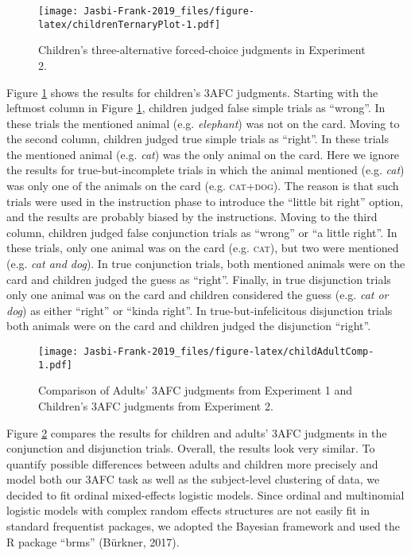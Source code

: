\documentclass[,man,floatsintext]{apa6}
\begin{document}
\begin{figure}
\centering
\texttt{[image: Jasbi-Frank-2019\_files/figure-latex/childrenTernaryPlot-1.pdf]}
\caption{\label{fig:childrenTernaryPlot}Children's three-alternative forced-choice judgments in Experiment 2.}
\end{figure}

Figure \ref{fig:childrenTernaryPlot} shows the results for children's 3AFC judgments. Starting with the leftmost column in Figure \ref{fig:childrenTernaryPlot}, children judged false simple trials as \enquote{wrong}. In these trials the mentioned animal (e.g. \emph{elephant}) was not on the card. Moving to the second column, children judged true simple trials as \enquote{right}. In these trials the mentioned animal (e.g. \emph{cat}) was the only animal on the card. Here we ignore the results for true-but-incomplete trials in which the animal mentioned (e.g. \emph{cat}) was only one of the animals on the card (e.g. \textsc{cat+dog}). The reason is that such trials were used in the instruction phase to introduce the \enquote{little bit right} option, and the results are probably biased by the instructions. Moving to the third column, children judged false conjunction trials as \enquote{wrong} or \enquote{a little right}. In these trials, only one animal was on the card (e.g. \textsc{cat}), but two were mentioned (e.g. \emph{cat and dog}). In true conjunction trials, both mentioned animals were on the card and children judged the guess as \enquote{right}. Finally, in true disjunction trials only one animal was on the card and children considered the guess (e.g. \emph{cat or dog}) as either \enquote{right} or \enquote{kinda right}. In true-but-infelicitous disjunction trials both animals were on the card and children judged the disjunction \enquote{right}.

\begin{figure}
\centering
\texttt{[image: Jasbi-Frank-2019\_files/figure-latex/childAdultComp-1.pdf]}
\caption{\label{fig:childAdultComp}Comparison of Adults' 3AFC judgments from Experiment 1 and Children's 3AFC judgments from Experiment 2.}
\end{figure}

Figure \ref{fig:childAdultComp} compares the results for children and adults' 3AFC judgments in the conjunction and disjunction trials. Overall, the results look very similar. To quantify possible differences between adults and children more precisely and model both our 3AFC task as well as the subject-level clustering of data, we decided to fit ordinal mixed-effects logistic models. Since ordinal and multinomial logistic models with complex random effects structures are not easily fit in standard frequentist packages, we adopted the Bayesian framework and used the R package \enquote{brms} (Bürkner, 2017).
\end{document}
